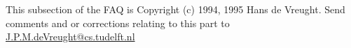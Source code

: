 This subsection of the FAQ is Copyright (c) 1994, 1995 Hans de Vreught.
Send comments and or corrections relating to this part to
\url{J.P.M.deVreught@cs.tudelft.nl}
